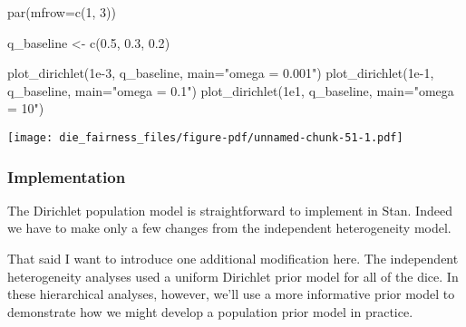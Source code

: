 \documentclass[
  letterpaper,
  DIV=11,
  numbers=noendperiod]{scrartcl}
\newenvironment{Shaded}{\begin{snugshade}}{\end{snugshade}}
\newcommand{\AttributeTok}[1]{\textcolor[rgb]{0.40,0.45,0.13}{#1}}
\newcommand{\ConstantTok}[1]{\textcolor[rgb]{0.56,0.35,0.01}{#1}}
\newcommand{\DecValTok}[1]{\textcolor[rgb]{0.68,0.00,0.00}{#1}}
\newcommand{\FloatTok}[1]{\textcolor[rgb]{0.68,0.00,0.00}{#1}}
\newcommand{\FunctionTok}[1]{\textcolor[rgb]{0.28,0.35,0.67}{#1}}
\newcommand{\NormalTok}[1]{\textcolor[rgb]{0.00,0.23,0.31}{#1}}
\newcommand{\OtherTok}[1]{\textcolor[rgb]{0.00,0.23,0.31}{#1}}
\newcommand{\SpecialCharTok}[1]{\textcolor[rgb]{0.37,0.37,0.37}{#1}}
\newcommand{\StringTok}[1]{\textcolor[rgb]{0.13,0.47,0.30}{#1}}
\begin{document}
\begin{Shaded}
\end{Shaded}

\begin{Shaded}
\begin{Highlighting}[]
\FunctionTok{par}\NormalTok{(}\AttributeTok{mfrow=}\FunctionTok{c}\NormalTok{(}\DecValTok{1}\NormalTok{, }\DecValTok{3}\NormalTok{))}

\NormalTok{q\_baseline }\OtherTok{\textless{}{-}} \FunctionTok{c}\NormalTok{(}\FloatTok{0.5}\NormalTok{, }\FloatTok{0.3}\NormalTok{, }\FloatTok{0.2}\NormalTok{)}

\FunctionTok{plot\_dirichlet}\NormalTok{(}\FloatTok{1e{-}3}\NormalTok{, q\_baseline, }\AttributeTok{main=}\StringTok{"omega = 0.001"}\NormalTok{)}
\FunctionTok{plot\_dirichlet}\NormalTok{(}\FloatTok{1e{-}1}\NormalTok{, q\_baseline, }\AttributeTok{main=}\StringTok{"omega = 0.1"}\NormalTok{)}
\FunctionTok{plot\_dirichlet}\NormalTok{(}\FloatTok{1e1}\NormalTok{,  q\_baseline, }\AttributeTok{main=}\StringTok{"omega = 10"}\NormalTok{)}
\end{Highlighting}
\end{Shaded}

\texttt{[image: die\_fairness\_files/figure-pdf/unnamed-chunk-51-1.pdf]}

\subsubsection{Implementation}\label{implementation-1}

The Dirichlet population model is straightforward to implement in Stan.
Indeed we have to make only a few changes from the independent
heterogeneity model.

That said I want to introduce one additional modification here. The
independent heterogeneity analyses used a uniform Dirichlet prior model
for all of the dice. In these hierarchical analyses, however, we'll use
a more informative prior model to demonstrate how we might develop a
population prior model in practice.
\end{document}
